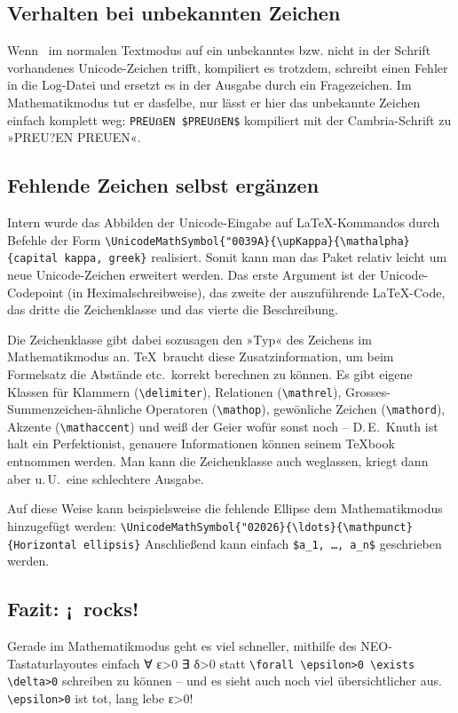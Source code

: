﻿\documentclass{scrartcl}
\begin{document}
\subsection{Verhalten bei unbekannten Zeichen}
Wenn \XeTeX\ im normalen Textmodus auf ein unbekanntes bzw. nicht in der Schrift vorhandenes Unicode-Zeichen trifft, kompiliert es trotzdem, schreibt einen Fehler in die Log-Datei und ersetzt es in der Ausgabe durch ein Fragezeichen. Im Mathematikmodus tut er dasſelbe, nur lässt er hier das unbekannte Zeichen einfach komplett weg: \verb|PREUẞEN $PREUẞEN$| kompiliert mit der Cambria-Schrift zu »PREU?EN PREUEN«.

\subsection{Fehlende Zeichen selbst ergänzen}
Intern wurde das Abbilden der Unicode-Eingabe auf \LaTeX-Kommandos durch Befehle der Form
\verb|\UnicodeMathSymbol{"0039A}{\upKappa}{\mathalpha}{capital kappa, greek}|
realisiert. Somit kann man das Paket relativ leicht um neue Unicode-Zeichen erweitert werden. Das erste Argument ist der Unicode-Codepoint (in Heximalschreibweise), das zweite der auszuführende \LaTeX-Code, das dritte die Zeichenklasse und das vierte die Beschreibung.

Die Zeichenklasse gibt dabei sozusagen den »Typ« des Zeichens im Mathematikmodus an. \TeX\ braucht diese Zusatzinformation, um beim Formelsatz die Abstände etc.\ korrekt berechnen zu können. Es gibt eigene Klassen für Klammern (\verb|\delimiter|), Relationen (\verb|\mathrel|), Grosses-Summenzeichen-ähnliche Operatoren (\verb|\mathop|), gewönliche Zeichen (\verb|\mathord|), Akzente (\verb|\mathaccent|) und weiß der Geier wofür sonst noch – D.\,E.~Knuth ist halt ein Perfektionist, genauere Informationen können seinem \TeX book entnommen werden. Man kann die Zeichenklasse auch weglassen, kriegt dann aber u.\,U.\ eine schlechtere Ausgabe.

Auf diese Weise kann beispielsweise die fehlende Ellipse dem Mathematikmodus hinzugefügt werden: \verb|\UnicodeMathSymbol{"02026}{\ldots}{\mathpunct}{Horizontal ellipsis}|
Anschließend kann einfach \verb|$a_1, …, a_n$| geschrieben werden.

\subsection{Fazit: ¡\XeTeX\ rocks!}
Gerade im Mathematikmodus geht es viel schneller, mithilfe des NEO-Tastaturlayoutes einfach ∀ ε>0 ∃ δ>0 statt \verb|\forall \epsilon>0 \exists \delta>0| schreiben zu können – und es sieht auch noch viel übersichtlicher aus. \verb|\epsilon>0| ist tot, lang lebe ε>0!
\end{document}
